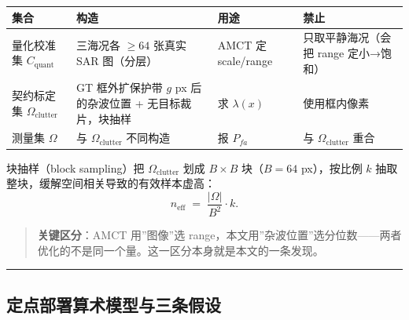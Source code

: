 {\def\LTcaptype{none} %
\begin{longtable}[]{@{}
  >{\raggedright\arraybackslash}p{}
  >{\raggedright\arraybackslash}p{}
  >{\raggedright\arraybackslash}p{}
  >{\raggedright\arraybackslash}p{}@{}}
\toprule\noalign{}
\begin{minipage}[b]{\linewidth}\raggedright
集合
\end{minipage} & \begin{minipage}[b]{\linewidth}\raggedright
构造
\end{minipage} & \begin{minipage}[b]{\linewidth}\raggedright
用途
\end{minipage} & \begin{minipage}[b]{\linewidth}\raggedright
禁止
\end{minipage} \\
\midrule\noalign{}
\endhead
\bottomrule\noalign{}
\endlastfoot
量化校准集 \(C_{\mathrm{quant}}\) & 三海况各 \(\ge 64\) 张真实 SAR
图（分层） & AMCT 定 scale/range & 只取平静海况（会把 range
定小→饱和） \\
契约标定集 \(\Omega_{\mathrm{clutter}}\) & GT 框外扩保护带 \(g\) px
后的杂波位置 + 无目标裁片，块抽样 & 求 \(\lambda(x)\) & 使用框内像素 \\
测量集 \(\Omega\) & 与 \(\Omega_{\mathrm{clutter}}\) 不同构造 & 报
\(P_{fa}\) & 与 \(\Omega_{\mathrm{clutter}}\) 重合 \\
\end{longtable}
}

块抽样（block sampling）把 \(\Omega_{\mathrm{clutter}}\) 划成
\(B\times B\) 块（\(B=64\) px），按比例 \(k\)
抽取整块，缓解空间相关导致的有效样本虚高： \[
n_{\mathrm{eff}} \;=\; \frac{|\Omega|}{B^{2}}\cdot k .
\tag{3.8}
\]

\begin{quote}
\textbf{关键区分}：AMCT 用''图像''选
range，本文用''杂波位置''选分位数------两者优化的不是同一个量。这一区分本身就是本文的一条发现。
\end{quote}

\begin{center}\rule{0.5\linewidth}{0.5pt}\end{center}

\subsection{定点部署算术模型与三条假设}\label{ux5b9aux70b9ux90e8ux7f72ux7b97ux672fux6a21ux578bux4e0eux4e09ux6761ux5047ux8bbe}

